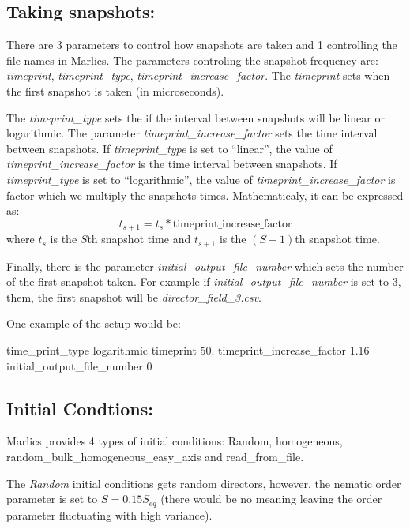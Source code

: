\documentclass{article}
\begin{document}
\subsection{Taking snapshots:}


There are 3 parameters to control how snapshots are taken and 1 controlling the file names in Marlics. The parameters controling the snapshot frequency are: \textit{timeprint}, \textit{timeprint_type}, \textit{timeprint_increase_factor}. The \textit{timeprint} sets when the first snapshot is taken (in microseconds). 

The \textit{timeprint_type} sets the if the interval between snapshots will be linear or logarithmic. The parameter \textit{timeprint_increase_factor} sets the time interval between snapshots. If \textit{timeprint_type} is set to ``linear'', the value of \textit{timeprint_increase_factor} is the time interval between snapshots. If \textit{timeprint_type} is set to ``logarithmic'', the value of \textit{timeprint_increase_factor} is factor which we multiply the snapshots times. Mathematicaly, it can be expressed as:
\begin{equation}
  t_{s+1}=t_s *\textrm{timeprint_increase_factor}
\end{equation}
where $t_s$ is the $S$th snapshot time and $t_{s+1}$ is the $(S+1)$th snapshot time.

Finally, there is the parameter \textit{initial_output_file_number} which sets the number of the first snapshot taken. For example if \textit{initial_output_file_number} is set to 3, them, the first snapshot will be \textit{director_field_3.csv}.

One example of the setup would be:

time_print_type	          logarithmic
timeprint                 50.        %
timeprint_increase_factor 1.16       %
initial_output_file_number   0


\subsection{Initial Condtions:}

Marlics provides 4 types of initial conditions: Random, homogeneous, random_bulk_homogeneous_easy_axis and read_from_file.

The \textit{Random} initial conditions gets random directors, however, the nematic order parameter is set to $S=0.15 S_{eq}$ (there would be no meaning leaving the order parameter fluctuating with high variance).
\end{document}

